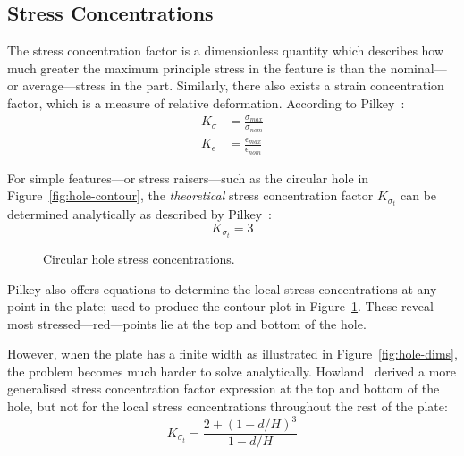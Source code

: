 \documentclass[a4paper,11pt,twocolumn]{article}
\begin{document}
\subsection{Stress Concentrations}

The stress concentration factor is a dimensionless quantity which describes how
much greater the maximum principle stress in the feature is than the 
nominal---or  average---stress in the part. Similarly, there also exists a 
strain concentration factor, which is a measure of relative deformation.
According to \mbox{Pilkey~\cite[p.~4]{pilkey2008peterson}}:
\begin{align}
    \label{eq:stress-conc}
    K_\sigma &= \frac{\sigma_{max}}{\sigma_{nom}} \\
    \label{eq:strain-conc}
    K_\epsilon &= \frac{\epsilon_{max}}{\epsilon_{nom}}
\end{align}

For simple features---or stress raisers---such as the 
circular hole in Figure~\vref{fig:hole-contour}, the \emph{theoretical} stress
concentration factor $K_{\sigma_t}$ can be determined analytically as described
by \mbox{Pilkey~\cite[pp.~180--181]{pilkey2008peterson}}:
\begin{equation} \label{eq:inf-hole-conc}
    K_{\sigma_t} = 3
\end{equation}

\begin{figure}[h]
    \centering
    \def\svgwidth{0.48\textwidth}
    
    \caption{Circular hole stress concentrations.}
    \label{fig:hole-contour}
\end{figure}

Pilkey also offers equations to determine the local stress concentrations at
any point in the plate; used to produce the contour plot in 
Figure~\ref{fig:hole-contour}. These reveal most stressed---red---points lie
at the top and bottom of the hole.

However, when the plate has a finite width as illustrated in 
Figure~\vref{fig:hole-dims}, the problem becomes much harder to solve
analytically. Howland~\cite{howland1930stresses} derived a more generalised 
stress concentration factor expression at the top and bottom of the hole, but
not for the local stress concentrations throughout the rest of the plate:
\begin{equation} \label{eq:hole-conc}
    K_{\sigma_t} = \frac{2 + (1 - d/H)^3}{1 - d/H}
\end{equation}
\end{document}
